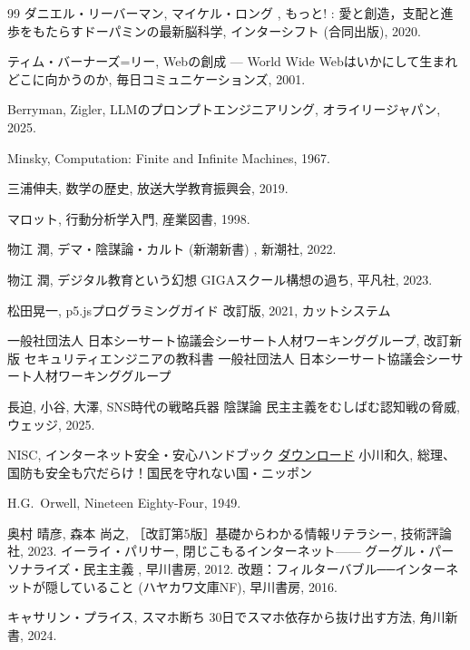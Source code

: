 \documentclass[book, paper=a4paper, 11pt]{jlreq}
\theoremstyle{definition}
\theoremstyle{remark}
\begin{document}
\begin{thebibliography}{99}
      ダニエル・リーバーマン, マイケル・ロング , 
      もっと! : 愛と創造，支配と進歩をもたらすドーパミンの最新脳科学, 
   インターシフト (合同出版), 2020.

      ティム・バーナーズ=リー, Webの創成 — 
      World Wide Webはいかにして生まれどこに向かうのか, 
      毎日コミュニケーションズ, 2001.

   Berryman, Zigler, LLMのプロンプトエンジニアリング, オライリージャパン, 2025.


    Minsky, Computation: Finite and Infinite Machines, 1967.
   
   三浦伸夫, 数学の歴史, 放送大学教育振興会, 2019.

   マロット, 行動分析学入門, 産業図書, 1998.

   
      物江 潤, デマ・陰謀論・カルト (新潮新書) , 新潮社, 2022.
   
      物江 潤, デジタル教育という幻想 GIGAスクール構想の過ち, 
      平凡社, 2023.

      松田晃一, p5.jsプログラミングガイド  改訂版, 2021, カットシステム
 
    一般社団法人 日本シーサート協議会シーサート人材ワーキンググループ, 
    改訂新版 セキュリティエンジニアの教科書 一般社団法人 日本シーサート協議会シーサート人材ワーキンググループ  
  
      長迫, 小谷, 大澤, SNS時代の戦略兵器 陰謀論 民主主義をむしばむ認知戦の脅威,
    ウェッジ, 2025.
 
      
      NISC, インターネット安全・安心ハンドブック
   \href{https://security-portal.cyber.go.jp/guidance/handbook.html}{ダウンロード}
       小川和久, 総理、国防も安全も穴だらけ！国民を守れない国・ニッポン


      H.G.~Orwell, Nineteen Eighty-Four, 1949.

       奥村 晴彦, 森本 尚之,
       ［改訂第5版］基礎からわかる情報リテラシー, 技術評論社, 2023. 
      イーライ・パリサー, 閉じこもるインターネット——
      グーグル・パーソナライズ・民主主義 , 早川書房, 2012.
      改題：フィルターバブル──インターネットが隠していること
      (ハヤカワ文庫NF), 早川書房, 2016.

      キャサリン・プライス,  
      スマホ断ち 30日でスマホ依存から抜け出す方法, 
      角川新書, 2024.
      

\end{thebibliography}
\end{document}
